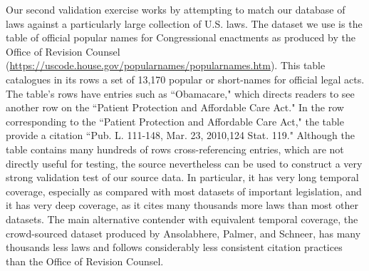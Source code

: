 \documentclass[fleqn,10pt]{wlscirep}
\begin{document}
Our second validation exercise works by attempting to match our database of laws against a particularly large collection of U.S. laws. The dataset we use is the table of official popular names for Congressional enactments as produced by the Office of Revision Counsel (\url{https://uscode.house.gov/popularnames/popularnames.htm}). This table catalogues in its rows a set of 13,170 popular or short-names for official legal acts. The table's rows have entries such as ``Obamacare," which directs readers to see another row on the ``Patient Protection and Affordable Care Act." In the row corresponding to the ``Patient Protection and Affordable Care Act," the table provide a citation ``Pub. L. 111-148, Mar. 23, 2010,124 Stat. 119." Although the table contains many hundreds of rows cross-referencing entries, which are not directly useful for testing, the source nevertheless can be used to construct a very strong validation test of our source data. In particular, it has very long temporal coverage, especially as compared with most datasets of important legislation, and it has very deep coverage, as it cites many thousands more laws than most other datasets. The main alternative contender with equivalent temporal coverage, the crowd-sourced dataset produced by Ansolabhere, Palmer, and Schneer,\cite{ansolabehere_palmer_schneer_2016} has many thousands less laws and follows considerably less consistent citation practices than the Office of Revision Counsel.
\end{document}
